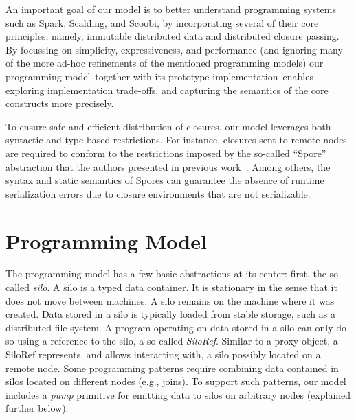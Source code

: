 \documentclass{easychair}
\begin{document}
An important goal of our model is to better understand programming systems such as Spark, Scalding, and
Scoobi, by incorporating several of their core principles; namely, immutable
distributed data and distributed closure passing. By focussing on simplicity,
expressiveness, and performance (and ignoring many of the more ad-hoc
refinements of the mentioned programming models) our
programming model--together with its prototype implementation--enables exploring
implementation trade-offs, and capturing the semantics of the core constructs more
precisely.


To ensure safe and efficient distribution of closures, our model leverages
both syntactic and type-based restrictions. For instance, closures sent to
remote nodes are required to conform to the restrictions imposed by the
so-called ``Spore'' abstraction that the authors presented in previous
work~\cite{MillerHO14}. Among others, the syntax and static semantics of
Spores can guarantee the absence of runtime serialization errors due to
closure environments that are not serializable.


\section{Programming Model}
\label{sec:model}


The programming model has a few basic abstractions at its center: first, the
so-called \emph{silo}. A silo is a typed data container. It is stationary in the
sense that it does not move between machines. A silo remains on the machine
where it was created. Data stored in a silo is typically loaded from stable
storage, such as a distributed file system. A program operating on data stored
in a silo can only do so using a reference to the silo, a so-called \emph{SiloRef}.
Similar to a proxy object, a SiloRef represents, and allows interacting with,
a silo possibly located on a remote node. Some programming patterns require
combining data contained in silos located on different nodes (e.g., joins). To
support such patterns, our model includes a \emph{pump} primitive for emitting
data to silos on arbitrary nodes (explained further below).
\end{document}
